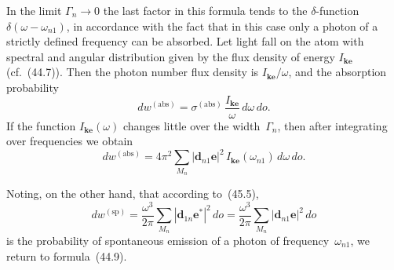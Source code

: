 In the limit $\Gamma_n \to 0$ the last factor in this formula tends to the $\delta$-function $\delta(\omega - \omega_{n1})$, in accordance with the fact that in this case only a photon of a strictly defined frequency can be absorbed. Let light fall on the atom with spectral and angular distribution given by the flux density of energy $I_{\mathbf{ke}}$ (cf.~(44.7)). Then the photon number flux density is $I_{\mathbf{ke}}/\omega$, and the absorption probability
\begin{equation}
dw^{(\mathrm{abs})} = \sigma^{(\mathrm{abs})}\,\frac{I_{\mathbf{ke}}}{\omega}\,d\omega\,do.
\tag{63.7}
\end{equation}
If the function $I_{\mathbf{ke}}(\omega)$ changes little over the width~$\Gamma_n$, then after integrating over frequencies we obtain
\[
dw^{(\mathrm{abs})} = 4\pi^2\sum_{M_n}|\mathbf{d}_{n1}\mathbf{e}|^2\,I_{\mathbf{ke}}(\omega_{n1})\,d\omega\,do.
\]

Noting, on the other hand, that according to~(45.5),
\[
dw^{(\mathrm{sp})} = \frac{\omega^3}{2\pi}\sum_{M_n}|\mathbf{d}_{1n}\mathbf{e}^*|^2\,do = \frac{\omega^3}{2\pi}\sum_{M_n}|\mathbf{d}_{n1}\mathbf{e}|^2\,do
\]
is the probability of spontaneous emission of a photon of frequency~$\omega_{n1}$, we return to formula~(44.9).
